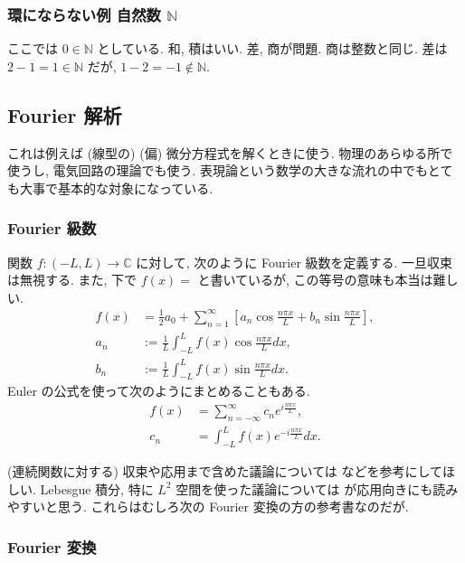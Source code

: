 \documentclass[openany, a4paper, oneside]{book}
\theoremstyle{break}
\theoremstyle{breakdefn}
\begin{document}
\subsubsection{環にならない例 自然数 $\mathbb{N}$}
\label{sec-11-3-17-1-3}

ここでは $0 \in \mathbb{N}$ としている.
和, 積はいい.
差, 商が問題.
商は整数と同じ.
差は $2 - 1 = 1 \in \mathbb{N}$ だが, $1 - 2 = - 1\notin \mathbb{N}$.
\subsection{Fourier 解析}
\label{sec-11-3-17-2}

これは例えば (線型の) (偏) 微分方程式を解くときに使う.
物理のあらゆる所で使うし, 電気回路の理論でも使う.
表現論という数学の大きな流れの中でもとても大事で基本的な対象になっている.
\subsubsection{Fourier 級数}
\label{sec-11-3-17-2-1}

関数 $f \colon (-L, L) \to \mathbb{C}$ に対して, 次のように Fourier 級数を定義する.
一旦収束は無視する.
また, 下で $f (x) =$ と書いているが, この等号の意味も本当は難しい.
\begin{align}
 f (x)
 & =
   \frac{1}{2}a_0 + \sum_{n=1}^{\infty}
   \left[ a_n \cos \frac{n \pi x}{L} + b_n \sin \frac{n \pi x}{L} \right], \\
 a_n
 &:=
 \frac{1}{L} \int_{- L}^{L} f (x) \cos \frac{n \pi x}{L} dx, \\
 b_n
 &:=
 \frac{1}{L} \int_{- L}^{L} f (x) \sin \frac{n \pi x}{L} dx.
\end{align}
Euler の公式を使って次のようにまとめることもある.
\begin{align}
 f (x)
 &=
 \sum_{n = - \infty}^{\infty} c_n e^{i \frac{n \pi x}{L}}, \\
 c_n
 &=
 \int_{- L}^{L} f (x) e^{- i \frac{n \pi x}{L}} dx.
\end{align}

(連続関数に対する) 収束や応用まで含めた議論については \cite{KimYamamoto1} などを参考にしてほしい.
Lebesgue 積分, 特に $L^2$ 空間を使った議論については \cite{SeizoIto1, LiebLoss1} が応用向きにも読みやすいと思う.
これらはむしろ次の Fourier 変換の方の参考書なのだが.
\subsubsection{Fourier 変換}
\label{sec-11-3-17-2-2}
\end{document}
